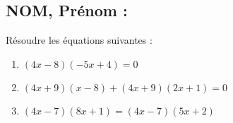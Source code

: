 \documentclass[a4paper,11pt,exos]{nsi}
\begin{document}
\subsection*{NOM, Prénom : \dotfill} 


\maketitle



\begin{exercice}
Résoudre les équations suivantes :
	\begin{enumerate}
		\item $(4x-8)(-5x+4)=0$ 
        \item $(4x+9)( x-8)+(4x+9)(2x+1)=0$
		\item $(4x-7)(8x+1)=(4x-7)(5x+2)$
	\end{enumerate}

\end{exercice}

\end{document}

